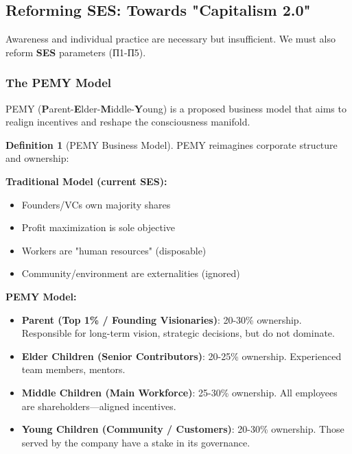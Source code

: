 \documentclass[11pt,a4paper]{article}
\newcommand{\SES}{\textbf{SES}}
\theoremstyle{definition}
\newtheorem{definition}{Definition}[section]
\theoremstyle{remark}
\begin{document}
\subsection{Reforming SES: Towards "Capitalism 2.0"}

Awareness and individual practice are necessary but insufficient. We must also reform \SES{} parameters (П1-П5).

\subsubsection{The PEMY Model}

PEMY (\textbf{P}arent-\textbf{E}lder-\textbf{M}iddle-\textbf{Y}oung) is a proposed business model that aims to realign incentives and reshape the consciousness manifold.

\begin{definition}[PEMY Business Model]
\label{def:pemy}
PEMY reimagines corporate structure and ownership:

\textbf{Traditional Model (current \SES{}):}
\begin{itemize}
\item Founders/VCs own majority shares
\item Profit maximization is sole objective
\item Workers are "human resources" (disposable)
\item Community/environment are externalities (ignored)
\end{itemize}

\textbf{PEMY Model:}
\begin{itemize}
\item \textbf{Parent (Top 1\% / Founding Visionaries)}: 20-30\% ownership. Responsible for long-term vision, strategic decisions, but do not dominate.
\item \textbf{Elder Children (Senior Contributors)}: 20-25\% ownership. Experienced team members, mentors.
\item \textbf{Middle Children (Main Workforce)}: 25-30\% ownership. All employees are shareholders—aligned incentives.
\item \textbf{Young Children (Community / Customers)}: 20-30\% ownership. Those served by the company have a stake in its governance.
\end{itemize}


\end{definition}
\end{document}
